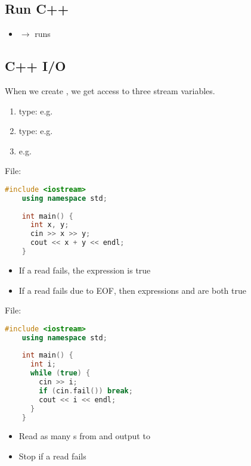 \subsection{Run C++}
\begin{itemize}
    \item {} $ \rightarrow $ runs 
\end{itemize}

\subsection{C++ I/O}

When we create , we get access to three stream variables.
\begin{enumerate}[1.]
    \item {}
    \subitem {}
    \subitem type: 
    \subitem e.g. 
    \item {}
    \subitem {}
    \subitem type: 
    \subitem e.g. 
    \item {}
    \subitem {}
    \subitem e.g. 
\end{enumerate}

File: 
\begin{lstlisting}[language = C++]
    #include <iostream>
    using namespace std;
    
    int main() {
      int x, y;
      cin >> x >> y;
      cout << x + y << endl;
    }
\end{lstlisting}
\begin{itemize}
    \item If a read fails, the expression  is true
    \item If a read fails due to EOF, then expressions 
    and  are both true
\end{itemize}

File: 
\begin{lstlisting}[language = C++]
    #include <iostream>
    using namespace std;
    
    int main() {
      int i;
      while (true) {
        cin >> i;
        if (cin.fail()) break;
        cout << i << endl;
      }
    }
\end{lstlisting}
\begin{itemize}
    \item Read as many s from  and output to 
    \item Stop if a read fails
\end{itemize}

